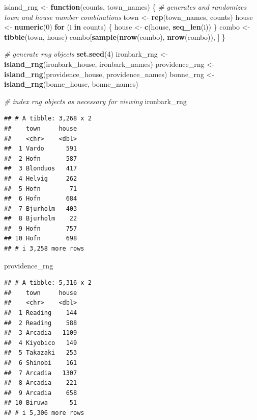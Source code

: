 \documentclass[
]{article}
\newenvironment{Shaded}{\begin{snugshade}}{\end{snugshade}}
\newcommand{\CommentTok}[1]{\textcolor[rgb]{0.56,0.35,0.01}{\textit{#1}}}
\newcommand{\ControlFlowTok}[1]{\textcolor[rgb]{0.13,0.29,0.53}{\textbf{#1}}}
\newcommand{\DecValTok}[1]{\textcolor[rgb]{0.00,0.00,0.81}{#1}}
\newcommand{\FunctionTok}[1]{\textcolor[rgb]{0.13,0.29,0.53}{\textbf{#1}}}
\newcommand{\NormalTok}[1]{#1}
\newcommand{\OtherTok}[1]{\textcolor[rgb]{0.56,0.35,0.01}{#1}}
\begin{document}
\begin{Shaded}
\begin{Highlighting}[]
\NormalTok{island\_rng }\OtherTok{\textless{}{-}} \ControlFlowTok{function}\NormalTok{(counts, town\_names) \{}
  \CommentTok{\# generates and randomizes town and house number combinations}
\NormalTok{  town }\OtherTok{\textless{}{-}} \FunctionTok{rep}\NormalTok{(town\_names, counts)}
\NormalTok{  house }\OtherTok{\textless{}{-}} \FunctionTok{numeric}\NormalTok{(}\DecValTok{0}\NormalTok{)}
  \ControlFlowTok{for}\NormalTok{ (i }\ControlFlowTok{in}\NormalTok{ counts) \{}
\NormalTok{    house }\OtherTok{\textless{}{-}} \FunctionTok{c}\NormalTok{(house, }\FunctionTok{seq\_len}\NormalTok{(i))}
\NormalTok{  \}}
\NormalTok{  combo }\OtherTok{\textless{}{-}} \FunctionTok{tibble}\NormalTok{(town, house)}
\NormalTok{  combo[}\FunctionTok{sample}\NormalTok{(}\FunctionTok{nrow}\NormalTok{(combo), }\FunctionTok{nrow}\NormalTok{(combo)), ]}
\NormalTok{\}}

\CommentTok{\# generate rng objects}
\FunctionTok{set.seed}\NormalTok{(}\DecValTok{4}\NormalTok{)}
\NormalTok{ironbark\_rng }\OtherTok{\textless{}{-}} \FunctionTok{island\_rng}\NormalTok{(ironbark\_house, ironbark\_names)}
\NormalTok{providence\_rng }\OtherTok{\textless{}{-}} \FunctionTok{island\_rng}\NormalTok{(providence\_house, providence\_names)}
\NormalTok{bonne\_rng }\OtherTok{\textless{}{-}} \FunctionTok{island\_rng}\NormalTok{(bonne\_house, bonne\_names)}

\CommentTok{\# index rng objects as necessary for viewing}
\NormalTok{ironbark\_rng}
\end{Highlighting}
\end{Shaded}

\begin{verbatim}
## # A tibble: 3,268 x 2
##    town     house
##    <chr>    <dbl>
##  1 Vardo      591
##  2 Hofn       587
##  3 Blonduos   417
##  4 Helvig     262
##  5 Hofn        71
##  6 Hofn       684
##  7 Bjurholm   403
##  8 Bjurholm    22
##  9 Hofn       757
## 10 Hofn       698
## # i 3,258 more rows
\end{verbatim}

\begin{Shaded}
\begin{Highlighting}[]
\NormalTok{providence\_rng}
\end{Highlighting}
\end{Shaded}

\begin{verbatim}
## # A tibble: 5,316 x 2
##    town     house
##    <chr>    <dbl>
##  1 Reading    144
##  2 Reading    588
##  3 Arcadia   1109
##  4 Kiyobico   149
##  5 Takazaki   253
##  6 Shinobi    161
##  7 Arcadia   1307
##  8 Arcadia    221
##  9 Arcadia    658
## 10 Biruwa      51
## # i 5,306 more rows
\end{verbatim}
\end{document}
